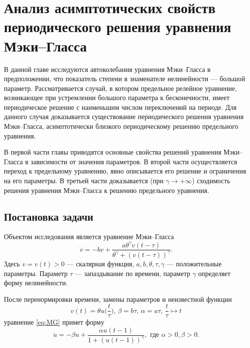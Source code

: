 \chapter{Анализ асимптотических свойств периодического решения уравнения Мэки--Гласса}\label{ch:ch1}

В данной главе исследуются автоколебания уравнения Мэки--Гласса в предположении, что показатель степени в знаменателе нелинейности --- большой параметр. Рассматривается случай, в котором предельное релейное уравнение, возникающее при устремлении большого параметра к бесконечности, имеет периодическое решение с наименьшим числом переключений на периоде. Для данного случая доказывается существование периодического решения уравнения Мэки--Гласса, асимптотически близкого периодическому решению предельного уравнения.

В первой части главы приводятся основные свойства решений уравнения Мэки--Гласса в зависимости от значения параметров. В второй части осуществляется переход к предельному уравнению, явно описывается его решение и ограничения на его параметры. В третьей части доказывается (при $\gamma \to +\infty$) сходимость решения уравнения Мэки--Гласса к решению предельного уравнения.

\section{Постановка задачи}

Объектом исследования является уравнение Мэки--Гласса 
\cite{Mackey1977, Glass1988}
\begin{equation}
	\label{eq:MG}
	\dot{v}=-b v+\frac{a \theta^{\gamma} v(t-\tau)}{\theta^{\gamma}+(v(t-\tau))^{\gamma}}.
\end{equation}
Здесь $v=v(t) > 0$ --- скалярная функция, $a, b, \theta, \tau, \gamma$ --- положительные параметры. Параметр $\tau$ --- запаздывание по времени, параметр $\gamma$ определяет форму нелинейности.

После перенормировки времени, замены параметров и неизвестной функции 
\begin{equation}
	\label{eq:substitutions_v}
	v(t) = \theta u\Big(\frac{t}{\tau}\Big),\, \beta = b\tau,\, \alpha=a\tau, \, \frac{t}{\tau} \mapsto t
\end{equation}
уравнение \eqref{eq:MG} примет форму
\begin{equation}
	\label{eq:MG_norm}
	\dot{u}=-\beta u+\frac{\alpha u(t-1)}{1+(u(t-1))^\gamma}, \text{ где } \alpha > 0, \beta > 0.
\end{equation}

